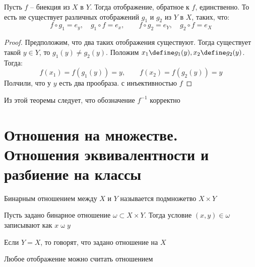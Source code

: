 \begin{theorem}
	Пусть $f$ -- биекция из $X$ в $Y$. Тогда отображение, обратное к $f$, единственно. То есть не существует различных отображений $g_1$ и $g_2$ из $Y$ в $X$, таких, что:
	$$ f \circ g_1 = e_y, \quad g_1 \circ f = e_x, \qquad f \circ g_2 = e_Y, \quad g_2 \circ f = e_X $$
\end{theorem}

\begin{proof}
	Предположим, что два таких отображения существуют. Тогда существует такой $y \in Y$, то $g_1(y) \ne g_2(y)$. Положим $x_1 \define g_1(y), x_2 \define g_2(y)$. Тогда:
	$$ f(x_1) = f(g_1(y)) = y, \qquad f(x_2) = f(g_2(y)) = y $$
	Полчили, что у $y$ есть два прообраза. \contra с инъективностью $f$
\end{proof}

\begin{note}
	Из этой теоремы следует, что обозначение $f^{-1}$ корректно
\end{note}

\section{Отношения на множестве. Отношения эквивалентности и разбиение на классы}

\begin{definition}
	Бинарным отношением между $X$ и $Y$ называется подмножетво $X \times Y$
\end{definition}

\begin{notation}
	Пусть задано бинарное отношение $\omega \subset X \times Y$. Тогда условие $(x, y) \in \omega$ записывают как $x \mathrel\omega y$
\end{notation}

\begin{notation}
	Если $Y = X$, то говорят, что задано отношение на $X$
\end{notation}

\begin{note}
	Любое отображение можно считать отношением
\end{note}

